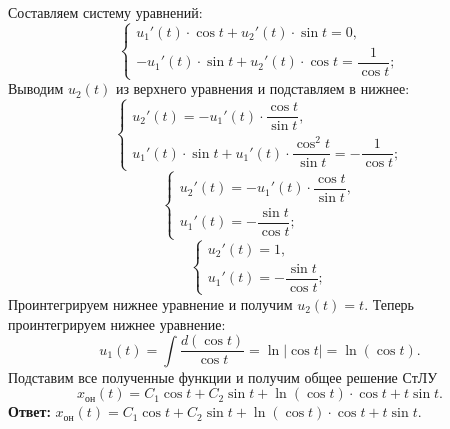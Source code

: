 \documentclass[a4paper, 12pt]{article}
\begin{document}
Составляем систему уравнений: $$\begin{cases}
	u_1'(t)\cdot \cos t + u_2'(t)\cdot \sin t = 0,\\
	-u_1'(t)\cdot \sin t + u_2'(t)\cdot \cos t = \dfrac{1}{\cos t};
\end{cases}$$
Выводим $u_2(t)$ из верхнего уравнения и подставляем в нижнее: $$\begin{cases}
	u_2'(t) = -u_1'(t)\cdot \dfrac{\cos t}{\sin t},\\
	u_1'(t)\cdot \sin t + u_1'(t)\cdot \dfrac{\cos^2t}{\sin t} = -\dfrac{1}{\cos t};
\end{cases}$$
$$\begin{cases}
	u_2'(t) = -u_1'(t)\cdot \dfrac{\cos t}{\sin t},\\
	u_1'(t) = -\dfrac{\sin t}{\cos t};
\end{cases}$$
$$\begin{cases}
	u_2'(t) = 1,\\
	u_1'(t) = -\dfrac{\sin t}{\cos t};
\end{cases}$$
Проинтегрируем нижнее уравнение и получим $u_2(t) = t$.
Теперь проинтегрируем нижнее уравнение: 
$$u_1(t) = \int\dfrac{d(\cos t)}{\cos t} = \ln|\cos t| = \ln(\cos t).$$
Подставим все полученные функции и получим общее решение СтЛУ $$x_\text{он}(t) = {C}_1\cos t + {C}_2\sin t + \ln(\cos t)\cdot \cos t + t\sin t.$$
\textbf{Ответ:} $x_\text{он}(t) ={C}_1\cos t + {C}_2\sin t + \ln(\cos t)\cdot \cos t + t\sin t.$
\end{document}
